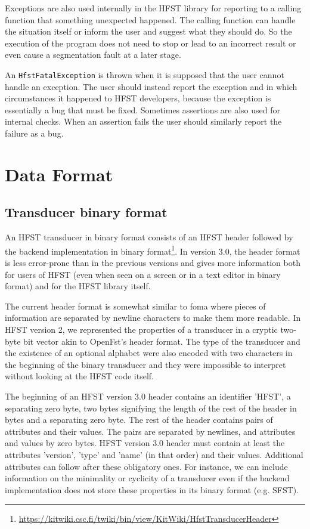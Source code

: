 \documentclass{llncs}
\begin{document}
Exceptions are also used internally in the HFST library for reporting to a 
calling function that something unexpected happened. The calling
function can handle the situation itself or inform the user and suggest
what they should do. 
So the execution of the program does not need to stop or lead to an
incorrect result or even cause a segmentation fault at a later stage.

An \texttt{HfstFatalException} is thrown when it is supposed that the user
cannot handle an exception. The user should instead report the exception
and in which circumstances it happened to HFST developers, because the exception
is essentially a bug that must be fixed. Sometimes assertions are also
used for internal checks. When an assertion fails the user should similarly
report the failure as a bug.


\section{Data Format}

\subsection{Transducer binary format}

An HFST transducer in binary format consists of an HFST header followed by the
backend implementation in binary 
format\footnote{\url{https://kitwiki.csc.fi/twiki/bin/view/KitWiki/HfstTransducerHeader}}. 
In version 3.0, the header
format is less error-prone than in the previous versions and gives more 
information both for users of HFST (even when seen on a screen or in a
text editor in binary format) and for the HFST library itself.
 
The current header format is somewhat similar to foma where pieces of 
information are separated by newline characters to make them more
readable. In HFST version 2, we represented the properties of a
transducer in a cryptic two-byte bit vector akin to OpenFst's header
format. The type of the transducer and the existence of an optional
alphabet were also encoded with two characters in the beginning of the
binary transducer and they were impossible to interpret without
looking at the HFST code itself.

The beginning of an HFST version 3.0 header contains an identifier
'HFST', a separating zero byte, two bytes signifying the length of
the rest of the header in bytes and a separating zero byte. The rest
of the header contains pairs of attributes and their values. The pairs
are separated by newlines, and attributes and values by zero bytes. 
HFST version 3.0 header must contain at least the attributes
'version', 'type' and 'name' (in that order) and their values. 
Additional attributes can follow after these obligatory ones. 
For instance, we can include information on the minimality or
cyclicity of a transducer even if the backend implementation does not
store these properties in its binary format (e.g. SFST). 
\end{document}
